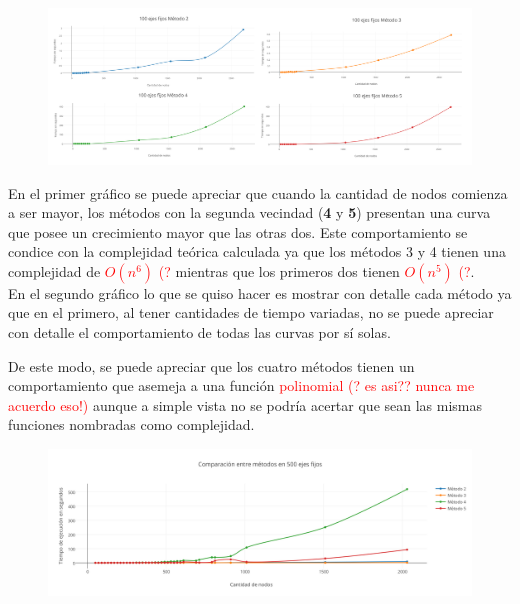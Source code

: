   \begin{figure}[h!]
   \begin{center}
 	\includegraphics[scale=0.08]{imagenes/local/tiempos/100ejes2.png}
   \end{center}
 \end{figure}

  \newpage  
 
En el primer gr\'afico se puede apreciar que cuando la cantidad de nodos comienza a ser mayor, los m\'etodos con la segunda vecindad (\textbf{4} y \textbf{5}) presentan una curva que posee un crecimiento mayor que las otras dos. Este comportamiento se condice con la complejidad te\'orica calculada ya que los m\'etodos 3 y 4 tienen una complejidad de \textcolor{red}{$O(n^6)$ (?} mientras que los primeros dos tienen \textcolor{red}{$O(n^5)$ (?}.\\

En el segundo gr\'afico lo que se quiso hacer es mostrar con detalle cada m\'etodo ya que en el primero, al tener cantidades de tiempo variadas, no se puede apreciar con detalle el comportamiento de todas las curvas por s\'i solas.

De este modo, se puede apreciar que los cuatro m\'etodos tienen un comportamiento que asemeja a una funci\'on \textcolor{red}{polinomial (? es asi?? nunca me acuerdo eso!)} aunque a simple vista no se podr\'ia acertar que sean las mismas funciones nombradas como complejidad.

\bigskip  
  
  \begin{figure}[h!]
   \begin{center}
 	\includegraphics[scale=0.55]{imagenes/local/tiempos/500ejes.png}
   \end{center}
 \end{figure}
 
